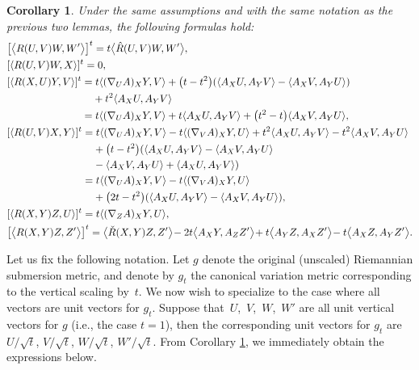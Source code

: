 \documentclass[11pt]{article}
\numberwithin{equation}{section}
\numberwithin{equation}{section}
\newtheorem{Corollary}[Theorem]{Corollary}
\begin{document}
\begin{Corollary}\label{formulas3}
	Under the same assumptions and with the same notation as the previous two lemmas, the following formulas hold:
	\begin{align*}
		&\bigl[\bigl\langle R(U,V)W,W' \bigr\rangle\bigr]^t =t\bigl\langle \hat{R}(U,V)W,W' \bigr\rangle, \\
		&[\langle R(U,V)W,X\rangle]^t =0, \\
		&[\langle R(X,U)Y,V \rangle]^t =t\langle (\nabla_U A)_X Y,V \rangle+\bigl(t-t^2\bigr)(\langle A_XU,A_YV\rangle-\langle A_XV,A_YU\rangle)\\
		&\hphantom{[\langle R(X,U)Y,V \rangle]^t =}{} +t^2\langle A_X U, A_Y V\rangle \\
		&\hphantom{[\langle R(X,U)Y,V \rangle]^t }{} =t\langle (\nabla_U A)_X Y,V \rangle +t\langle A_X U, A_Y V\rangle+\bigl(t^2-t\bigr)\langle A_XV,A_YU\rangle,\\
		&[\langle R(U,V)X,Y \rangle]^t =t\langle (\nabla_U A)_X Y,V \rangle-t\langle (\nabla_V A)_X Y,U\rangle+t^2\langle A_XU,A_YV \rangle-t^2\langle A_XV, A_YU \rangle \\
		&\hphantom{[\langle R(U,V)X,Y \rangle]^t =}{} +\bigl(t-t^2\bigr)(\langle A_XU,A_YV\rangle-\langle A_XV,A_YU\rangle\\
&\hphantom{[\langle R(U,V)X,Y \rangle]^t =}{}- \langle A_XV,A_YU\rangle + \langle A_XU,A_YV\rangle)\\
		&\hphantom{[\langle R(U,V)X,Y \rangle]^t }{} =t\langle (\nabla_U A)_X Y,V \rangle-t\langle (\nabla_V A)_X Y,U\rangle\\
		&\hphantom{[\langle R(U,V)X,Y \rangle]^t =}{} +\bigl(2t-t^2\bigr)(\langle A_XU,A_YV\rangle-\langle A_XV,A_YU\rangle),\\
		&[\langle R(X,Y)Z,U \rangle]^t = t\langle (\nabla_ZA)_X Y,U \rangle, \\
		&\bigl[\bigl\langle R(X,Y)Z,Z' \bigr\rangle\bigr]^t=\bigl\langle \check{R}(X,Y)Z,Z' \bigr\rangle\!-2t\bigl\langle A_XY,A_ZZ' \bigr\rangle\! + t\bigl\langle A_Y Z,A_X Z'\bigr\rangle\!-t\bigl\langle A_X Z, A_Y Z'\bigr\rangle.
	\end{align*}
\end{Corollary}

Let us fix the following notation. Let $g$ denote the original (unscaled) Riemannian submersion metric, and denote by $g_t$ the canonical variation metric corresponding to the vertical scaling by~$t$. We now wish to specialize to the case where all vectors are unit vectors for $g_t$. Suppose that~$U$,~$V$,~$W$,~$W'$ are all unit vertical vectors for $g$ (i.e., the case $t=1$), then the corresponding unit vectors for $g_t$ are $U/\sqrt t$, $V/\sqrt t$, $W/\sqrt t$, $W'/\sqrt t$. From Corollary \ref{formulas3}, we immediately obtain the expressions below.
\end{document}
